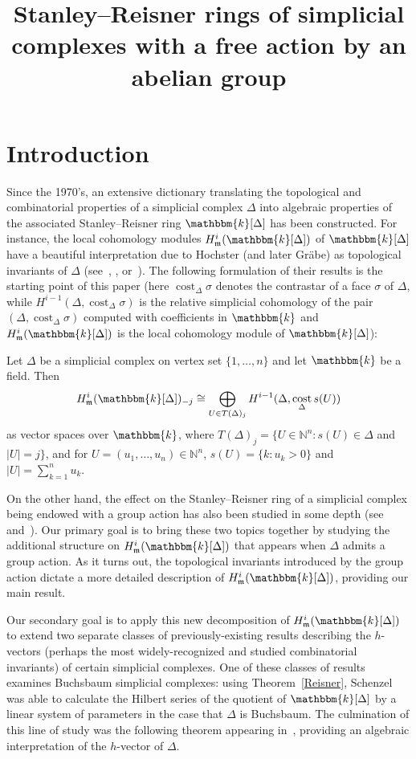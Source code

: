 \documentclass[ALCO,ThmDefs,Unicode]{cedram}
\title[Stanley--Reisner rings of simplicial complexes with a group action]{Stanley--Reisner rings of simplicial complexes with a free action by an abelian group}
\author{\firstname{Connor} \lastname{Sawaske}}
\DeclareMathOperator\cost{cost}
\newcommand{\field}{\mathbbm{k}}
\newcommand{\NN}{{\mathbb N}}
\newcommand{\mideal}{\ensuremath{\mathfrak{m}}}
\begin{document}
\maketitle


\section{Introduction}

Since the 1970's, an extensive dictionary translating the topological and combinatorial properties of a simplicial complex $\Delta$ into algebraic properties of the associated Stanley--Reisner ring $\field[\Delta]$ has been constructed. For instance, the local cohomology modules $H_\mideal^i(\field[\Delta])$ of $\field[\Delta]$ have a beautiful interpretation due to Hochster (and later Gr\"abe) as topological invariants of $\Delta$ (see~\cite[Theorem~2]{Grabe}, \cite{Reisner}, or~\cite[Section~II.4]{St-96}). The following formulation of their results is the starting point of this paper (here $\cost_\Delta \sigma$ denotes the contrastar of a face $\sigma$ of $\Delta$, while $H^{i-1}(\Delta, \cost_\Delta \sigma)$ is the relative simplicial cohomology of the pair $(\Delta, \cost_\Delta \sigma)$ computed with coefficients in $\field$ and $H_\mideal^i(\field[\Delta])$ is the local cohomology module of $\field[\Delta]$):

\begin{theo}\label{Reisner}
Let $\Delta$ be a simplicial complex on vertex set $\{1, \ldots, n\}$ and let $\field$ be a field. Then
\[
H_\mideal^i(\field[\Delta])_{-j}\cong \bigoplus_{U\in T(\Delta)_j}H^{i-1}(\Delta, \cost_\Delta s(U))
\]
as vector spaces over $\field$, where $T(\Delta)_j=\{U\in \NN^n: s(U)\in \Delta$ and $|U|=j\}$, and for $U=(u_1, \ldots, u_n)\in\NN^n$, $s(U)=\{k:u_k>0\}$ and $|U|=\sum_{k=1}^nu_k$.
\end{theo}

On the other hand, the effect on the Stanley--Reisner ring of a simplicial complex being endowed with a group action has also been studied in some depth (see~\cite[Section~III.8]{St-96} and~\cite{AdinThesis}). Our primary goal is to bring these two topics together by studying the additional structure on $H_\mideal^i(\field[\Delta])$ that appears when $\Delta$ admits a group action. As it turns out, the topological invariants introduced by the group action dictate a more detailed description of $H_\mideal^i(\field[\Delta])$, providing our main result.

Our secondary goal is to apply this new decomposition of $H_\mideal^i(\field[\Delta])$ to extend two separate classes of previously-existing results describing the $h$-vectors (perhaps the most widely-recognized and studied combinatorial invariants) of certain simplicial complexes. One of these classes of results examines Buchsbaum simplicial complexes: using Theorem~\ref{Reisner}, Schenzel was able to calculate the Hilbert series of the quotient of $\field[\Delta]$ by a linear system of parameters in the case that $\Delta$ is Buchsbaum. The culmination of this line of study was the following theorem appearing in~\cite{Schenzel}, providing an algebraic interpretation of the $h$-vector of $\Delta$.
\end{document}
